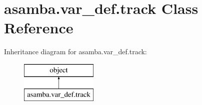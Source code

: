 \hypertarget{classasamba_1_1var__def_1_1track}{}\section{asamba.\+var\+\_\+def.\+track Class Reference}
\label{classasamba_1_1var__def_1_1track}
Inheritance diagram for asamba.\+var\+\_\+def.\+track\+:\begin{figure}[H]
\begin{center}
\leavevmode
\includegraphics[height=2.000000cm]{classasamba_1_1var__def_1_1track}
\end{center}
\end{figure}
